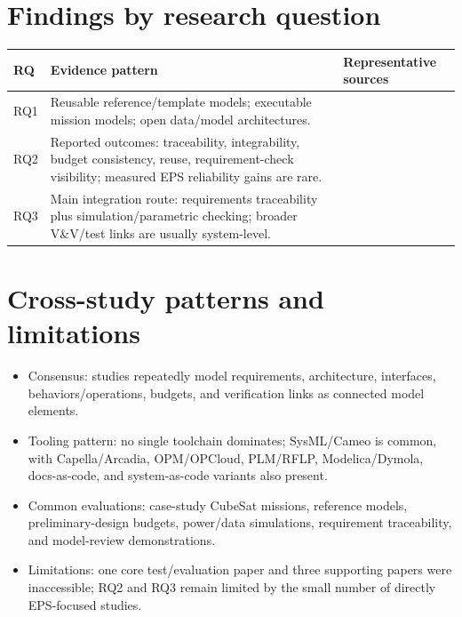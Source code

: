 \documentclass[10pt]{article}
\begin{document}
\section*{Findings by research question}
\begin{center}
\begin{tabular}{p{1.3cm}p{10.2cm}p{3.8cm}}
\toprule
RQ & Evidence pattern & Representative sources\\
\midrule
RQ1 & Reusable reference/template models; executable mission models; open data/model architectures. & \cite{paper-0004,paper-0011,paper-0039,paper-0001,paper-0033,paper-0029,paper-0081} \\
RQ2 & Reported outcomes: traceability, integrability, budget consistency, reuse, requirement-check visibility; measured EPS reliability gains are rare. & \cite{paper-0026,paper-0041,paper-0053,paper-0001,paper-0027,paper-0078,paper-0080} \\
RQ3 & Main integration route: requirements traceability plus simulation/parametric checking; broader V\&V/test links are usually system-level. & \cite{paper-0001,paper-0026,paper-0033,paper-0015,paper-0034,paper-0059} \\
\bottomrule
\end{tabular}
\end{center}

\section*{Cross-study patterns and limitations}
\begin{itemize}
\item Consensus: studies repeatedly model requirements, architecture, interfaces, behaviors/operations, budgets, and verification links as connected model elements.
\item Tooling pattern: no single toolchain dominates; SysML/Cameo is common, with Capella/Arcadia, OPM/OPCloud, PLM/RFLP, Modelica/Dymola, docs-as-code, and system-as-code variants also present.
\item Common evaluations: case-study CubeSat missions, reference models, preliminary-design budgets, power/data simulations, requirement traceability, and model-review demonstrations.
\item Limitations: one core test/evaluation paper and three supporting papers were inaccessible; RQ2 and RQ3 remain limited by the small number of directly EPS-focused studies.
\end{itemize}
\end{document}
